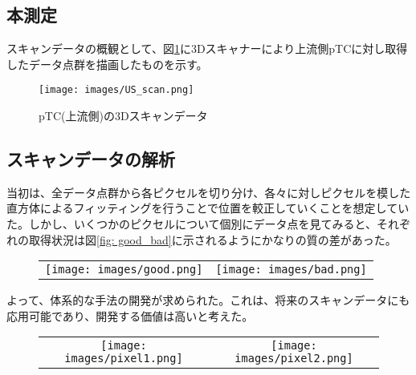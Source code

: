 \documentclass[Yonemoto_master.tex]{subfiles}
\begin{document}
\subsection{本測定}
スキャンデータの概観として、図\ref{fig: US_scan}に3Dスキャナーにより上流側pTCに対し取得したデータ点群を描画したものを示す。

\begin{figure}[h]
\begin{center}
\texttt{[image: images/US\_scan.png]}
\caption{pTC(上流側)の3Dスキャンデータ}
\label{fig: US_scan}
\end{center}
\end{figure}

\subsection{スキャンデータの解析}

  当初は、全データ点群から各ピクセルを切り分け、各々に対しピクセルを模した直方体によるフィッティングを行うことで位置を較正していくことを想定していた。しかし、いくつかのピクセルについて個別にデータ点を見てみると、それぞれの取得状況は図\ref{fig: good_bad}に示されるようにかなりの質の差があった。

\begin{figure}[h]
    \begin{tabular}{cc}
      \begin{minipage}[t]{0.45\hsize}
        \centering
        \texttt{[image: images/good.png]}
      \end{minipage} &
      \begin{minipage}[t]{0.45\hsize}
        \centering
        \texttt{[image: images/bad.png]}
      \end{minipage}
    \end{tabular}
    \caption{}
    \label{fig: good_badl}
  \end{figure}

よって、体系的な手法の開発が求められた。これは、将来のスキャンデータにも応用可能であり、開発する価値は高いと考えた。

\begin{figure}[h]
    \begin{tabular}{cc}
      \begin{minipage}[t]{0.45\hsize}
        \centering
        \texttt{[image: images/pixel1.png]}
      \end{minipage} &
      \begin{minipage}[t]{0.45\hsize}
        \centering
        \texttt{[image: images/pixel2.png]}
      \end{minipage}
    \end{tabular}
    \caption{}
    \label{fig: scan_pixel}
  \end{figure}
\end{document}
